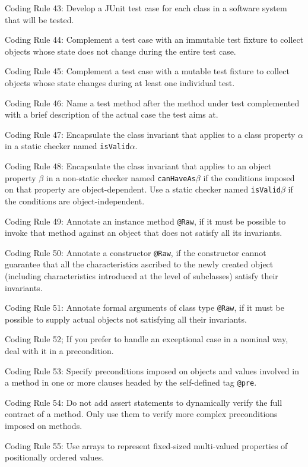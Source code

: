 \documentclass{article}
\begin{document}
\par Coding Rule 43: Develop a JUnit test case for each class in a software system that will be tested.
\par Coding Rule 44: Complement a test case with an immutable test fixture to collect objects whose state does not change during the entire test case.
\par Coding Rule 45: Complement a test case with a mutable test fixture to collect objects whose state changes during at least one individual test.
\par Coding Rule 46: Name a test method after the method under test complemented with a brief description of the actual case the test aims at.
\par Coding Rule 47: Encapsulate the class invariant that applies to a class property $\alpha$ in a static checker named \texttt{isValid}$\alpha$.
\par Coding Rule 48: Encapsulate the class invariant that applies to an object property $\beta$ in a non-static checker named \texttt{canHaveAs}$\beta$ if the conditions imposed on that property are object-dependent. Use a static checker named \texttt{isValid}$\beta$ if the conditions are object-independent.
\par Coding Rule 49: Annotate an instance method \texttt{@Raw}, if it must be possible to invoke that method against an object that does not satisfy all its invariants.
\par Coding Rule 50: Annotate a constructor \texttt{@Raw}, if the constructor cannot guarantee that all the characteristics ascribed to the newly created object (including characteristics introduced at the level of subclasses) satisfy their invariants.
\par Coding Rule 51: Annotate formal arguments of class type \texttt{@Raw}, if it must be possible to supply actual objects not satisfying all their invariants.
\par Coding Rule 52; If you prefer to handle an exceptional case in a nominal way, deal with it in a precondition.
\par Coding Rule 53: Specify preconditions imposed on objects and values involved in a  method in one or more clauses headed by the self-defined tag \texttt{@pre}.
\par Coding Rule 54: Do not add assert statements to dynamically verify the full contract of a method. Only use them to verify more complex preconditions imposed on methods.
\par Coding Rule 55: Use arrays to represent fixed-sized multi-valued properties of positionally ordered values.
\end{document}
